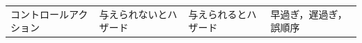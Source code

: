 \documentclass[12pt,a4j]{ujreport}
\begin{document}
\begin{footnotesize}
\begin{tabularx}{\linewidth}{
            >{\hsize=0.7\hsize}X|
            >{\hsize=1.1\hsize}X|
            >{\hsize=1.1\hsize}X|
            >{\hsize=1.1\hsize}X
        }
        \endfirsthead
        \multicolumn{4}{l}{前ページからの続き}                                                                                                                                                                                                                                                                                                                                                                                                                                                                                                                                                                                                                                                                                                                                                                                                                                                                                                                                                                                                              \\
        \hline
        コントロールアクション                                        & 与えられないとハザード                                                                                                                                                                                                                                                                                                                                                                                                                                                                                     & 与えられるとハザード                                                                                                                                                                                                                                                                                                            & 早過ぎ，遅過ぎ，誤順序                                                                                                               \\  \hline \hline
        \endhead

\end{tabularx}
\end{footnotesize}
\end{document}
